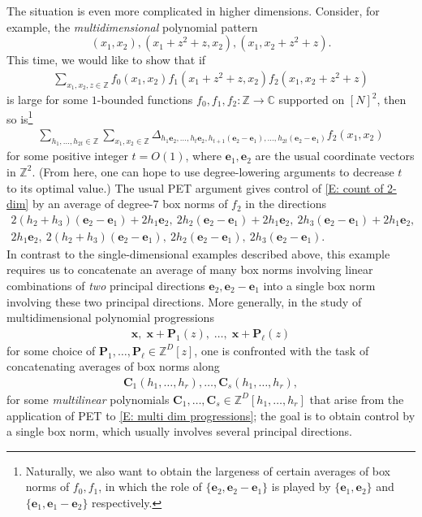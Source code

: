 \documentclass[11pt]{amsart}
\theoremstyle{definition}
\newcommand{\C}{{\mathbb C}}
\newcommand{\Z}{{\mathbb Z}}
\newcommand{\bc}{{\textbf{C}}}
\newcommand{\be}{{\mathbf{e}}}
\newcommand{\p}{{\textbf{P}}}
\newcommand{\bx}{{\textbf{x}}}
\begin{document}
The situation is even more complicated in higher dimensions.  Consider, for example, the \textit{multidimensional} polynomial pattern
\begin{equation}\label{E: 2-dim prog}
(x_1, x_2), (x_1 + z^2+z, x_2), (x_1, x_2 + z^2 + z).    
\end{equation}
This time, we 
would like to show that if
\begin{align}\label{E: count of 2-dim}
    \sum_{x_1,x_2,z\in\Z}f_0(x_1, x_2)f_1(x_1 + z^2 + z, x_2)f_2(x_1, x_2 + z^2 + z)
\end{align}
is large 
for some $1$-bounded functions $f_0, f_1, f_2:\Z\to\C$ supported on $[N]^2$, then so is\footnote{Naturally, we also want to obtain the largeness of certain averages of box norms of $f_0, f_1$, in which the role of $\{\be_2,\be_2-\be_1\}$ is played by $\{\be_1, \be_2\}$ and $\{\be_1, \be_1-\be_2\}$ respectively.}
\begin{align*}
    \sum_{h_1, \ldots, h_{2t}\in\Z}\sum_{x_1,x_2\in\Z}\Delta_{h_1 \be_2, \ldots, h_t \be_2, h_{t+1}(\be_2 - \be_1), \ldots, h_{2t}(\be_2 - \be_1)}f_2(x_1, x_2)
\end{align*}
for some positive integer $t=O(1)$, where $\be_1, \be_2$ are the usual coordinate vectors in $\mathbb{Z}^2$.  (From here, one can hope to use degree-lowering arguments to decrease $t$ to  its optimal value.)  The usual PET argument gives control of \eqref{E: count of 2-dim} by an average of degree-$7$ box norms of $f_2$ in the directions
\begin{gather}\label{E: examplealgebraicdirections}
    2(h_2+h_3)(\be_2 - \be_1) + 2h_1 \be_2,\ 2h_2(\be_2 - \be_1) + 2h_1 \be_2,\ 2 h_3(\be_2 - \be_1) + 2h_1 \be_2,\\ 
    \nonumber 2h_1 \be_2,\ 2(h_2+h_3)(\be_2 - \be_1),\ 2h_2(\be_2 - \be_1),\  2h_3(\be_2 - \be_1).
\end{gather}
In contrast to the single-dimensional examples described above, this example requires us to concatenate an average of many box norms involving {linear combinations} of \emph{two} principal directions $\be_2, \be_2-\be_1$ into a single box norm involving  these {two} principal directions. 
More generally, in the study of multidimensional polynomial progressions
\begin{align}\label{E: multi dim progressions}
    \bx, \; \bx + \p_1(z),\; \ldots,\; \bx + \p_\ell(z)
\end{align} 
for some choice of $\p_1, \ldots, \p_\ell\in\Z^D[z]$, one is confronted with the task of concatenating averages of box norms along
\begin{align}\label{E: multi dim directions general}
    \bc_1(h_1, \ldots, h_r), \ldots,\bc_s(h_1, \ldots, h_r),
\end{align}
for some \emph{multilinear} polynomials $\bc_1, \ldots, \bc_s\in\Z^D[h_1, \ldots, h_r]$ that arise from the application of PET to \eqref{E: multi dim progressions}; the goal is to obtain control by a single box norm, which usually involves several principal directions.
\end{document}
